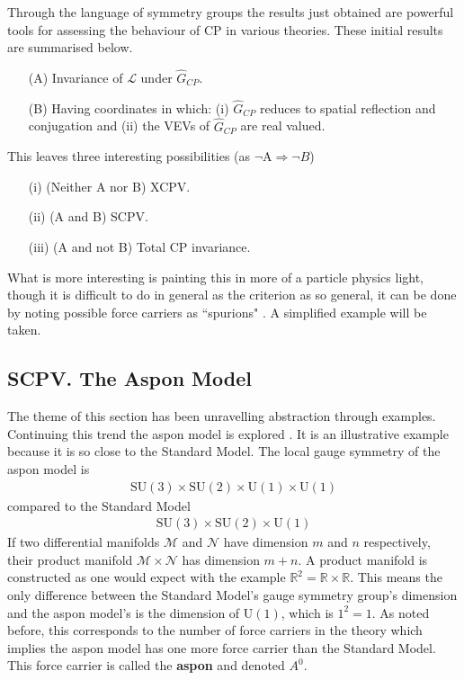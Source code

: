 \documentclass[floatfix,aps,prd,amsmath,amssymb]{revtex4}
\begin{document}
Through the language of symmetry groups the results just obtained are powerful tools for assessing the behaviour of CP in various theories. These initial results are summarised below.
\begin{itemize}
\item[(A)] Invariance of $\mathcal{L}$ under $\hat{G}_{CP}$.
\item[(B)] Having coordinates in which: (i) $\hat{G}_{CP}$ reduces to spatial reflection and conjugation and (ii) the VEVs of $\hat{G}_{CP}$ are real valued.
\end{itemize}
This leaves three interesting possibilities  (as $\lnot$A$\Rightarrow\lnot B$) 
\begin{itemize}
\item[(i)] (Neither A nor B) XCPV. 
\item[(ii)] (A and B) SCPV.
\item[(iii)] (A and not B) Total CP invariance.
\end{itemize}
What is more interesting is painting this in more of a particle physics light, though it is difficult to do in general as the criterion as so general, it can be done by noting possible force carriers as ``spurions" \cite{SCPV5}. A simplified example will be taken.\\

\subsection{SCPV. The Aspon Model}

The theme of this section has been unravelling abstraction through examples. Continuing this trend the aspon model is explored \cite{SCPV7}. It is an illustrative example because it is so close to the Standard Model. The local gauge symmetry of the aspon model is
\begin{align*}
\mathrm{SU}(3) \times \mathrm{SU}(2) \times \mathrm{U}(1) \times \mathrm{U}(1)
\end{align*}
compared to the Standard Model
\begin{align*}
\mathrm{SU}(3) \times \mathrm{SU}(2) \times \mathrm{U}(1)
\end{align*}
If two differential manifolds $\mathcal{M}$ and $\mathcal{N}$ have dimension $m$ and $n$ respectively, their product manifold $\mathcal{M} \times \mathcal{N}$ has dimension $m+n$. A product manifold is constructed as one would expect with the example $\mathbb{R}^2 = \mathbb{R}\times \mathbb{R}$. This means the only difference between the Standard Model's gauge symmetry group's dimension and the aspon model's is the dimension of $\mathrm{U}(1)$, which is $1^2=1$. As noted before, this corresponds to the number of force carriers in the theory which implies the aspon model has one more force carrier than the Standard Model. This force carrier is called the \textbf{aspon} and denoted $A^0$.
\end{document}
